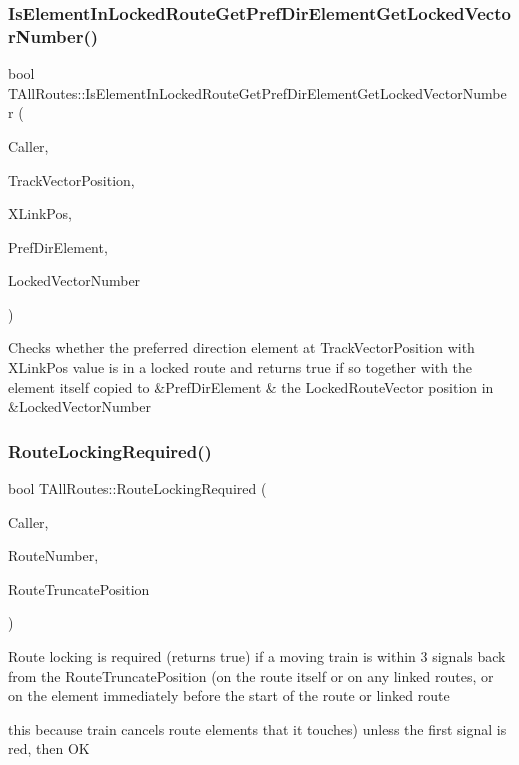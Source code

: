 \subsubsection{\texorpdfstring{Is\+Element\+In\+Locked\+Route\+Get\+Pref\+Dir\+Element\+Get\+Locked\+Vector\+Number()}{IsElementInLockedRouteGetPrefDirElementGetLockedVectorNumber()}}
{\footnotesize\ttfamily bool T\+All\+Routes\+::\+Is\+Element\+In\+Locked\+Route\+Get\+Pref\+Dir\+Element\+Get\+Locked\+Vector\+Number (\begin{DoxyParamCaption}\item[{int}]{Caller,  }\item[{int}]{Track\+Vector\+Position,  }\item[{int}]{X\+Link\+Pos,  }\item[{\mbox{\hyperlink{class_t_pref_dir_element}{T\+Pref\+Dir\+Element}} \&}]{Pref\+Dir\+Element,  }\item[{int \&}]{Locked\+Vector\+Number }\end{DoxyParamCaption})}

Checks whether the preferred direction element at Track\+Vector\+Position with X\+Link\+Pos value is in a locked route and returns true if so together with the element itself copied to \&Pref\+Dir\+Element \& the Locked\+Route\+Vector position in \&Locked\+Vector\+Number \mbox{\label{class_t_all_routes_a38ede0231e26c62498999d1873d547a2}} 
\subsubsection{\texorpdfstring{Route\+Locking\+Required()}{RouteLockingRequired()}}
{\footnotesize\ttfamily bool T\+All\+Routes\+::\+Route\+Locking\+Required (\begin{DoxyParamCaption}\item[{int}]{Caller,  }\item[{int}]{Route\+Number,  }\item[{int}]{Route\+Truncate\+Position }\end{DoxyParamCaption})}

Route locking is required (returns true) if a moving train is within 3 signals back from the Route\+Truncate\+Position (on the route itself or on any linked routes, or on the element immediately before the start of the route or linked route
\begin{DoxyItemize}
\item this because train cancels route elements that it touches) unless the first signal is red, then OK 
\end{DoxyItemize}\mbox{\label{class_t_all_routes_a2ab882d5be1966d8a492d13886531c45}} 
